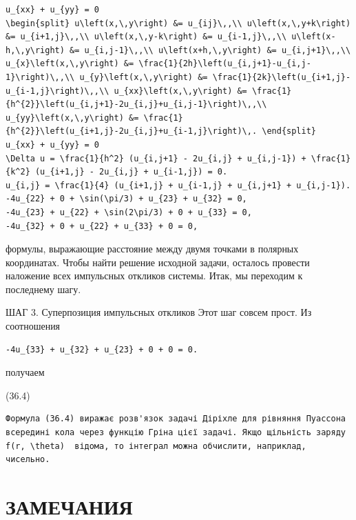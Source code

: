 \documentclass[
  ukrainian,
]{article}
\begin{document}
\begin{verbatim}
u_{xx} + u_{yy} = 0
\begin{split} u\left(x,\,y\right) &= u_{ij}\,,\\ u\left(x,\,y+k\right) &= u_{i+1,j}\,,\\ u\left(x,\,y-k\right) &= u_{i-1,j}\,,\\ u\left(x-h,\,y\right) &= u_{i,j-1}\,,\\ u\left(x+h,\,y\right) &= u_{i,j+1}\,,\\ u_{x}\left(x,\,y\right) &= \frac{1}{2h}\left(u_{i,j+1}-u_{i,j-1}\right)\,,\\ u_{y}\left(x,\,y\right) &= \frac{1}{2k}\left(u_{i+1,j}-u_{i-1,j}\right)\,,\\ u_{xx}\left(x,\,y\right) &= \frac{1}{h^{2}}\left(u_{i,j+1}-2u_{i,j}+u_{i,j-1}\right)\,,\\ u_{yy}\left(x,\,y\right) &= \frac{1}{h^{2}}\left(u_{i+1,j}-2u_{i,j}+u_{i-1,j}\right)\,. \end{split}
u_{xx} + u_{yy} = 0
\Delta u = \frac{1}{h^2} (u_{i,j+1} - 2u_{i,j} + u_{i,j-1}) + \frac{1}{k^2} (u_{i+1,j} - 2u_{i,j} + u_{i-1,j}) = 0.
u_{i,j} = \frac{1}{4} (u_{i+1,j} + u_{i-1,j} + u_{i,j+1} + u_{i,j-1}).
-4u_{22} + 0 + \sin(\pi/3) + u_{23} + u_{32} = 0,
-4u_{23} + u_{22} + \sin(2\pi/3) + 0 + u_{33} = 0,
-4u_{32} + 0 + u_{22} + u_{33} + 0 = 0,
\end{verbatim}

формулы, выражающие расстояние между двумя точками в полярных
координатах. Чтобы найти решение исходной задачи, осталось провести
наложение всех импульсных откликов системы. Итак, мы переходим к
последнему шагу.

ШАГ 3. Суперпозиция импульсных откликов Этот шаг совсем прост. Из
соотношения

\begin{verbatim}
-4u_{33} + u_{32} + u_{23} + 0 + 0 = 0.
\end{verbatim}

получаем

(36.4)

\begin{verbatim}
Формула (36.4) виражає розв'язок задачі Діріхле для рівняння Пуассона всередині кола через функцію Гріна цієї задачі. Якщо щільність заряду  f(r, \theta)  відома, то інтеграл можна обчислити, наприклад, чисельно.
\end{verbatim}

\section{ЗАМЕЧАНИЯ}\label{ux437ux430ux43cux435ux447ux430ux43dux438ux44f-2}
\end{document}
